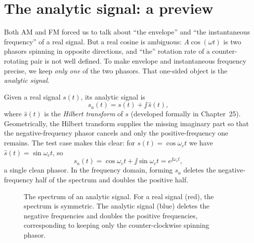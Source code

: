 \section{The analytic signal: a preview}
\label{ch23:analytic}

Both AM and FM forced us to talk about ``the envelope'' and ``the instantaneous
frequency'' of a real signal. But a real cosine is ambiguous: $A\cos(\omega t)$ is two
phasors spinning in opposite directions, and ``the'' rotation rate of a counter-rotating
pair is not well defined. To make envelope and instantaneous frequency precise, we keep
\emph{only one} of the two phasors. That one-sided object is the \emph{analytic signal}.

Given a real signal $s(t)$, its analytic signal is
\begin{equation}
\label{ch23:analytic-def}
s_a(t) = s(t) + \jj\,\hat{s}(t),
\end{equation}
where $\hat{s}(t)$ is the \emph{Hilbert transform} of $s$ (developed formally in Chapter~25).
Geometrically, the Hilbert transform supplies the missing imaginary part so that
the negative-frequency phasor cancels and only the positive-frequency one remains. The
test case makes this clear: for $s(t)=\cos\omega_c t$ we have $\hat s(t)=\sin\omega_c t$,
so
\begin{equation}
s_a(t) = \cos\omega_c t + \jj\sin\omega_c t = e^{\jj\omega_c t},
\end{equation}
a single clean phasor. In the frequency domain, forming $s_a$ deletes the negative-
frequency half of the spectrum and doubles the positive half.

\begin{figure}[htbp]
\centering
{}
\caption{The spectrum of an analytic signal. For a real signal (red), the spectrum is symmetric. The analytic signal (blue) deletes the negative frequencies and doubles the positive frequencies, corresponding to keeping only the counter-clockwise spinning phasor.}
\label{ch23:fig-analytic}
\end{figure}

